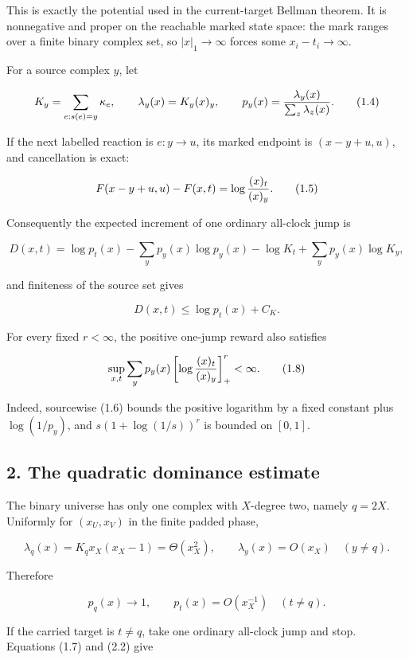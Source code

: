 This is exactly the potential used in the current-target Bellman
theorem. It is nonnegative and proper on the reachable marked state
space: the mark ranges over a finite binary complex set, so
\(\lvert x\rvert_1\to\infty\) forces some \(x_i-t_i\to\infty\).

For a source complex \(y\), let

\[
 K_y=\sum_{e:s(e)=y}\kappa_e,
 \qquad \lambda_y(x)=K_y(x)_y,
 \qquad p_y(x)={\lambda_y(x)\over\sum_z\lambda_z(x)}.      \tag{1.4}
\]

If the next labelled reaction is \(e:y\to u\), its marked endpoint is
\((x-y+u,u)\), and cancellation is exact:

\[
 F(x-y+u,u)-F(x,t)=\log{(x)_t\over(x)_y}.                 \tag{1.5}
\]

Consequently the expected increment of one ordinary all-clock jump is

\[
 D(x,t)=\log p_t(x)-\sum_y p_y(x)\log p_y(x)
        -\log K_t+\sum_y p_y(x)\log K_y,                  \tag{1.6}
\]

and finiteness of the source set gives

\[
                         D(x,t)\le \log p_t(x)+C_K.        \tag{1.7}
\]

For every fixed \(r<\infty\), the positive one-jump reward also
satisfies

\[
 \sup_{x,t}\sum_y p_y(x)
       \left[\log{(x)_t\over(x)_y}\right]_+^r<\infty.     \tag{1.8}
\]

Indeed, sourcewise (1.6) bounds the positive logarithm by a fixed
constant plus \(\log(1/p_y)\), and \(s(1+\log(1/s))^r\) is bounded on
\([0,1]\).

\subsection{2. The quadratic dominance
estimate}

The binary universe has only one complex with \(X\)-degree two, namely
\(q=2X\). Uniformly for \((x_U,x_V)\) in the finite padded phase,

\[
 \lambda_q(x)=K_q x_X(x_X-1)=\Theta(x_X^2),
 \qquad
 \lambda_y(x)=O(x_X)\quad(y\ne q).                        \tag{2.1}
\]

Therefore

\[
 p_q(x)\longrightarrow1,
 \qquad
 p_t(x)=O(x_X^{-1})\quad(t\ne q).                         \tag{2.2}
\]

If the carried target is \(t\ne q\), take one ordinary all-clock jump
and stop. Equations (1.7) and (2.2) give

